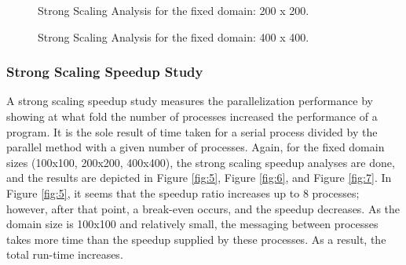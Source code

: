 \documentclass[12pt]{article}
\begin{document}
\begin{figure}[H]
\centering
{}
\caption{Strong Scaling Analysis for the fixed domain: 200 x 200.}
\label{fig:3}
\end{figure}

\begin{figure}[H]
\centering
{}
\caption{Strong Scaling Analysis for the fixed domain: 400 x 400.} 
\label{fig:4}
\end{figure}

\newpage
\subsubsection{Strong Scaling Speedup Study}

A strong scaling speedup study measures the parallelization performance by showing at what fold the number of processes increased the performance of a program. It is the sole result of time taken for a serial process divided by the parallel method with a given number of processes. Again, for the fixed domain sizes (100x100, 200x200, 400x400), the strong scaling speedup analyses are done, and the results are depicted in Figure \ref{fig:5}, Figure \ref{fig:6}, and Figure \ref{fig:7}.
\noindent
In Figure \ref{fig:5}, it seems that the speedup ratio increases up to 8 processes; however, after that point, a break-even occurs, and the speedup decreases. As the domain size is 100x100 and relatively small, the messaging between processes takes more time than the speedup supplied by these processes. As a result, the total run-time increases.
\end{document}
